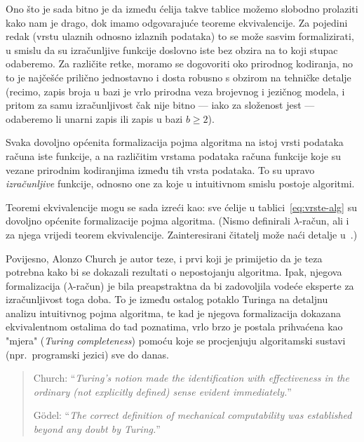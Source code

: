 Ono što je sada bitno je da između ćelija takve tablice možemo slobodno prolaziti kako nam je drago, dok imamo odgovarajuće teoreme ekvivalencije. Za pojedini redak (vrstu ulaznih odnosno izlaznih podataka) to se može sasvim formalizirati, u smislu da su izračunljive funkcije doslovno iste bez obzira na to koji stupac odaberemo. Za različite retke, moramo se dogovoriti oko prirodnog kodiranja, no to je najčešće prilično jednostavno i dosta robusno s obzirom na tehničke detalje (recimo, zapis broja u bazi je vrlo prirodna veza brojevnog i jezičnog modela, i pritom za samu izračunljivost čak nije bitno --- iako za složenost jest --- odaberemo li unarni zapis ili zapis u bazi $b\ge2$).

\begin{ctteza}
Svaka dovoljno općenita formalizacija pojma algoritma na istoj vrsti podataka ra\-ču\-na iste funkcije, a na različitim vrstama podataka računa funkcije koje su vezane prirodnim kodiranjima između tih vrsta podataka. To su upravo \emph{izračunljive} funkcije, odnosno one za koje u intuitivnom smislu postoje algoritmi.
\end{ctteza}

Teoremi ekvivalencije mogu se sada izreći kao: sve ćelije u tablici~\eqref{eq:vrste-alg} su dovoljno općenite formalizacije pojma algoritma. (Nismo definirali $\lambda$-račun, ali i za njega vrijedi teorem ekvivalencije. Zainteresirani čitatelj može naći detalje u~\cite{lovnicki}.)

Povijesno, Alonzo Church je autor teze, i prvi koji je primijetio da je teza potrebna kako bi se dokazali rezultati o nepostojanju algoritma. Ipak, njegova formalizacija ($\lambda$-račun) je bila preapstraktna da bi zadovoljila vodeće eksperte za izračunljivost toga doba. To je između ostalog potaklo Turinga na detaljnu analizu intuitivnog pojma algoritma, te kad je njegova formalizacija dokazana ekvivalentnom ostalima do tad poznatima, vrlo brzo je postala prihvaćena kao "mjera" (\emph{Turing completeness}) pomoću koje se procjenjuju algoritamski sustavi (npr.\ programski jezici) sve do danas.

\begin{quote}
    Church: ``{\emph{Turing's notion made the identification with effectiveness in the ordinary (not explicitly defined) sense evident immediately.}}''
    
    G\"odel: ``{\emph{The correct definition of mechanical computability was established beyond any doubt by Turing.}}''
\end{quote}

